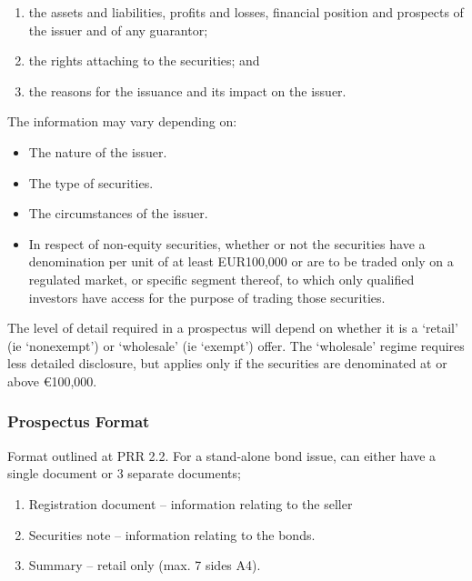 \documentclass[
]{article}
\newenvironment{Shaded}{}{}
\newcommand{\NormalTok}[1]{#1}
\providecommand{\tightlist}{%
  \setlength{\itemsep}{0pt}\setlength{\parskip}{0pt}}
\begin{document}
\begin{enumerate}
\def\labelenumi{\arabic{enumi}.}
\tightlist
\item
  the assets and liabilities, profits and losses, financial position and
  prospects of the issuer and of any guarantor;
\item
  the rights attaching to the securities; and
\item
  the reasons for the issuance and its impact on the issuer.
\end{enumerate}

The information may vary depending on:

\begin{itemize}
\tightlist
\item
  The nature of the issuer.
\item
  The type of securities.
\item
  The circumstances of the issuer.
\item
  In respect of non-equity securities, whether or not the securities
  have a denomination per unit of at least EUR100,000 or are to be
  traded only on a regulated market, or specific segment thereof, to
  which only qualified investors have access for the purpose of trading
  those securities.
\end{itemize}

\begin{Shaded}
\begin{Highlighting}[]
\NormalTok{The level of detail required in a prospectus will depend on whether it is a ‘retail’ (ie ‘nonexempt’) or ‘wholesale’ (ie ‘exempt’) offer. The ‘wholesale’ regime requires less detailed disclosure, but applies only if the securities are denominated at or above €100,000.}
\end{Highlighting}
\end{Shaded}

\hypertarget{prospectus-format}{%
\subsubsection{Prospectus Format}\label{prospectus-format}}

Format outlined at PRR 2.2. For a stand-alone bond issue, can either
have a single document or 3 separate documents;

\begin{enumerate}
\def\labelenumi{\arabic{enumi}.}
\tightlist
\item
  Registration document -- information relating to the seller
\item
  Securities note -- information relating to the bonds.
\item
  Summary -- retail only (max. 7 sides A4).
\end{enumerate}
\end{document}
